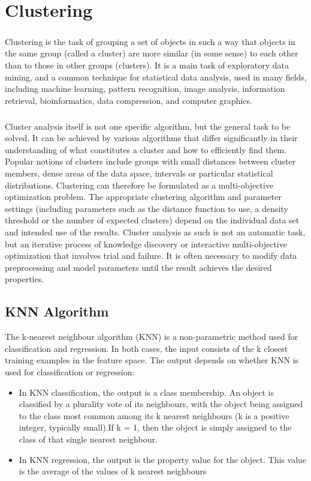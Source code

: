 \documentclass{report}
\begin{document}
\chapter{Clustering}
\paragraph{}Clustering is the task of grouping a set of objects in such a way that objects in the same group (called a cluster) are more similar (in some sense) to each other than to those in other groups (clusters). It is a main task of exploratory data mining, and a common technique for statistical data analysis, used in many fields, including machine learning, pattern recognition, image analysis, information retrieval, bioinformatics, data compression, and computer graphics.

\paragraph{}Cluster analysis itself is not one specific algorithm, but the general task to be solved. It can be achieved by various algorithms that differ significantly in their understanding of what constitutes a cluster and how to efficiently find them. Popular notions of clusters include groups with small distances between cluster members, dense areas of the data space, intervals or particular statistical distributions. Clustering can therefore be formulated as a multi-objective optimization problem. The appropriate clustering algorithm and parameter settings (including parameters such as the distance function to use, a density threshold or the number of expected clusters) depend on the individual data set and intended use of the results. Cluster analysis as such is not an automatic task, but an iterative process of knowledge discovery or interactive multi-objective optimization that involves trial and failure. It is often necessary to modify data preprocessing and model parameters until the result achieves the desired properties.

\section{KNN  Algorithm}
The k-nearest neighbour algorithm (KNN) is a non-parametric method used for classification and regression. In both cases, the input consists of the k closest training examples in the feature space. The output depends on whether KNN is used for classification or regression:
\begin{itemize}
\item In KNN classification, the output is a class membership. An object is classified by a plurality vote of its neighbours, with the object being assigned to the class most common among its k nearest neighbours (k is a positive integer, typically small).If k = 1, then the object is simply assigned to the class of that single nearest neighbour.
\item In KNN regression, the output is the property value for the object. This value is the average of the values of k nearest neighbours
\end{itemize}
\end{document}
